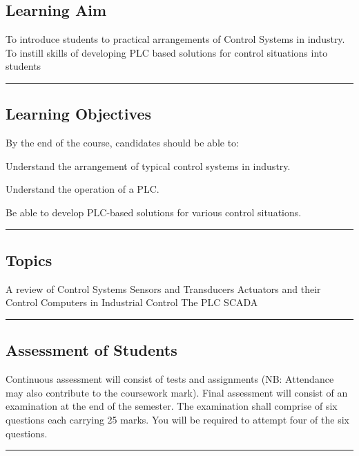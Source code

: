 \subsection*{Learning Aim}
To introduce students to practical arrangements of Control Systems in industry.
To instill skills of developing PLC based solutions for control situations into students
\vspace{2ex} \hrule\vspace{2ex}

\subsection*{Learning Objectives}
By the end of the course, candidates should be able to:
\begin{outline}
    \1      Understand the arrangement of typical control systems in industry.

    \1  	Understand the operation of a PLC.

    \1  	Be able to develop PLC-based solutions for various control situations.

\end{outline}
\vspace{2ex}\hrule\vspace{2ex}

\subsection*{Topics}
\begin{outline}
    \1 A review of Control Systems
    \1 Sensors and Transducers
    \1 Actuators and their Control
    \1 Computers in Industrial Control
    \1 The PLC
    \1 SCADA
\end{outline}
\vspace{2ex} \hrule\vspace{2ex}

\subsection*{Assessment of Students}
\begin{outline}
    \1 Continuous assessment will consist of tests and assignments (NB: Attendance may also contribute to the coursework mark).
    \1 Final assessment will consist of an examination at the end of the semester. The examination shall comprise of six questions each carrying 25 marks. You will be required to attempt four of the six questions.
\end{outline}
\vspace{2ex}\hrule\vspace{2ex}

